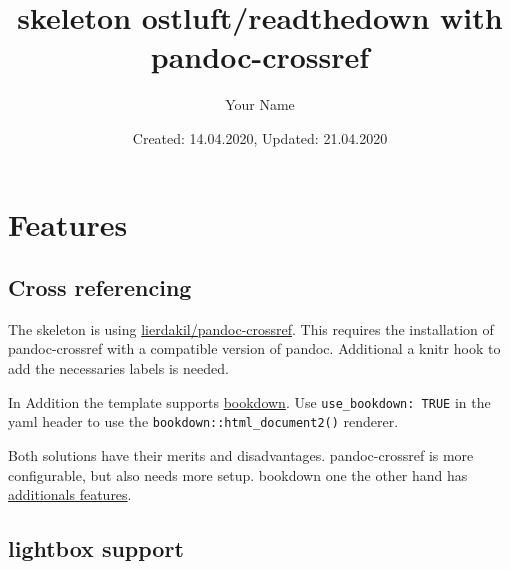 \documentclass[
]{article}
\title{skeleton ostluft/readthedown with pandoc-crossref}
\author{Your Name}
\date{Created: 14.04.2020, Updated: 21.04.2020}
\makeatletter
\def\fps@figure{htbp}
\makeatother
\begin{document}
\makeatletter\renewcommand*{\fps@figure}{H}\makeatother

\begin{figure}[t]
\hfill
{}
\end{figure}

\maketitle

\hypertarget{features}{%
\section{Features}\label{features}}

\hypertarget{cross-referencing}{%
\subsection{Cross referencing}\label{cross-referencing}}

The skeleton is using
\href{https://github.com/lierdakil/pandoc-crossref}{lierdakil/pandoc-crossref}.
This requires the installation of pandoc-crossref with a compatible
version of pandoc. Additional a knitr hook to add the necessaries labels
is needed.

In Addition the template supports
\href{https://github.com/rstudio/bookdown}{bookdown}. Use
\texttt{use\_bookdown:\ TRUE} in the yaml header to use the
\texttt{bookdown::html\_document2()} renderer.

Both solutions have their merits and disadvantages. pandoc-crossref is
more configurable, but also needs more setup. bookdown one the other
hand has
\href{https://bookdown.org/yihui/bookdown/motivation.html}{additionals
features}.

\hypertarget{lightbox-support}{%
\subsection{lightbox support}\label{lightbox-support}}
\end{document}
